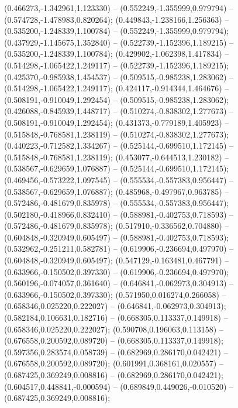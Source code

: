  (0.466273,-1.342961,1.123330) -- (0.552249,-1.355999,0.979794) -- (0.574728,-1.478983,0.820264);
 (0.449843,-1.238166,1.256363) -- (0.535200,-1.248339,1.100784) -- (0.552249,-1.355999,0.979794);
 (0.437929,-1.145675,1.352840) -- (0.522739,-1.152396,1.189215) -- (0.535200,-1.248339,1.100784);
 (0.429902,-1.062398,1.417834) -- (0.514298,-1.065422,1.249117) -- (0.522739,-1.152396,1.189215);
 (0.425370,-0.985938,1.454537) -- (0.509515,-0.985238,1.283062) -- (0.514298,-1.065422,1.249117);
 (0.424117,-0.914344,1.464676) -- (0.508191,-0.910049,1.292454) -- (0.509515,-0.985238,1.283062);
 (0.426088,-0.845939,1.448717) -- (0.510274,-0.838302,1.277673) -- (0.508191,-0.910049,1.292454);
 (0.431373,-0.779189,1.405923) -- (0.515848,-0.768581,1.238119) -- (0.510274,-0.838302,1.277673);
 (0.440223,-0.712582,1.334267) -- (0.525144,-0.699510,1.172145) -- (0.515848,-0.768581,1.238119);
 (0.453077,-0.644513,1.230182) -- (0.538567,-0.629659,1.076887) -- (0.525144,-0.699510,1.172145);
 (0.469456,-0.573222,1.097545) -- (0.555534,-0.557383,0.956447) -- (0.538567,-0.629659,1.076887);
 (0.485968,-0.497967,0.963785) -- (0.572486,-0.481679,0.835978) -- (0.555534,-0.557383,0.956447);
 (0.502180,-0.418966,0.832410) -- (0.588981,-0.402753,0.718593) -- (0.572486,-0.481679,0.835978);
 (0.517910,-0.336562,0.704880) -- (0.604848,-0.320949,0.605497) -- (0.588981,-0.402753,0.718593);
 (0.532962,-0.251211,0.582781) -- (0.619906,-0.236694,0.497970) -- (0.604848,-0.320949,0.605497);
 (0.547129,-0.163481,0.467791) -- (0.633966,-0.150502,0.397330) -- (0.619906,-0.236694,0.497970);
 (0.560196,-0.074057,0.361640) -- (0.646841,-0.062973,0.304913) -- (0.633966,-0.150502,0.397330);
 (0.571950,0.016274,0.266058) -- (0.658346,0.025220,0.222027) -- (0.646841,-0.062973,0.304913);
 (0.582184,0.106631,0.182716) -- (0.668305,0.113337,0.149918) -- (0.658346,0.025220,0.222027);
 (0.590708,0.196063,0.113158) -- (0.676558,0.200592,0.089720) -- (0.668305,0.113337,0.149918);
 (0.597356,0.283574,0.058739) -- (0.682969,0.286170,0.042421) -- (0.676558,0.200592,0.089720);
 (0.601991,0.368161,0.020557) -- (0.687425,0.369249,0.008816) -- (0.682969,0.286170,0.042421);
 (0.604517,0.448841,-0.000594) -- (0.689849,0.449026,-0.010520) -- (0.687425,0.369249,0.008816);
